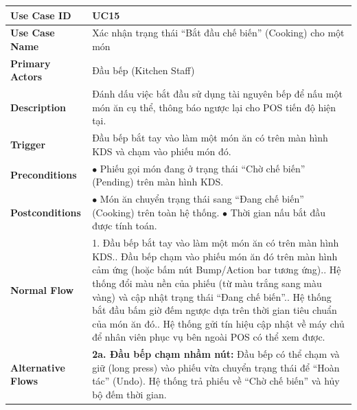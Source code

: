 \begin{longtable}{|p{3.5cm}|p{12.5cm}|}
\hline
\textbf{Use Case ID} & UC15 \\ \hline
\textbf{Use Case Name} & Xác nhận trạng thái ``Bắt đầu chế biến'' (Cooking) cho một món \\ \hline
\textbf{Primary Actors} & Đầu bếp (Kitchen Staff) \\ \hline
\textbf{Description} & Đánh dấu việc bắt đầu sử dụng tài nguyên bếp để nấu một món ăn cụ thể, thông báo ngược lại cho POS tiến độ hiện tại. \\ \hline
\textbf{Trigger} & Đầu bếp bắt tay vào làm một món ăn có trên màn hình KDS và chạm vào phiếu món đó. \\ \hline
\textbf{Preconditions} & $\bullet$ Phiếu gọi món đang ở trạng thái ``Chờ chế biến'' (Pending) trên màn hình KDS. \\ \hline
\textbf{Postconditions} &
$\bullet$ Món ăn chuyển trạng thái sang ``Đang chế biến'' (Cooking) trên toàn hệ thống.\newline
$\bullet$ Thời gian nấu bắt đầu được tính toán. \\ \hline
\textbf{Normal Flow} &
1. Đầu bếp bắt tay vào làm một món ăn có trên màn hình KDS.\newline
2. Đầu bếp chạm vào phiếu món ăn đó trên màn hình cảm ứng (hoặc bấm nút Bump/Action bar tương ứng).\newline
3. Hệ thống đổi màu nền của phiếu (từ màu trắng sang màu vàng) và cập nhật trạng thái ``Đang chế biến''.\newline
4. Hệ thống bắt đầu bấm giờ đếm ngược dựa trên thời gian tiêu chuẩn của món ăn đó.\newline
5. Hệ thống gửi tín hiệu cập nhật về máy chủ để nhân viên phục vụ bên ngoài POS có thể xem được. \\ \hline
\textbf{Alternative Flows} &
\textbf{2a. Đầu bếp chạm nhầm nút:} Đầu bếp có thể chạm và giữ (long press) vào phiếu vừa chuyển trạng thái để ``Hoàn tác'' (Undo). Hệ thống trả phiếu về ``Chờ chế biến'' và hủy bộ đếm thời gian. \\ \hline
\end{longtable}

